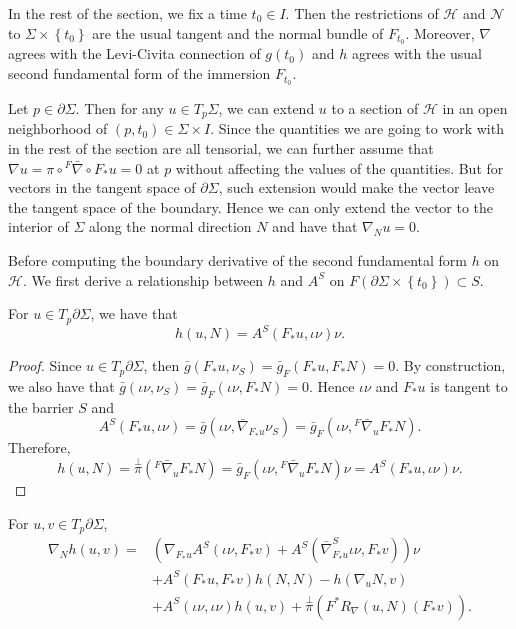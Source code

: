 In the rest of the section, we fix a time $t_0 \in I$. Then the restrictions of $\mathcal{H} $ and $\mathcal{N} $  to $\Sigma \times \left\{ t_0 \right\} $ are the usual tangent and the normal bundle of $F_{t_0}$. Moreover, $\nabla $ agrees with the Levi-Civita connection of $g(t_0)$ and $h$ agrees with the usual second fundamental form of the immersion $F_{t_0}$. 

Let $p \in \partial \Sigma $. Then for any $u \in T_p \Sigma $, we can extend $u$ to a section of $\mathcal{H} $ in an open neighborhood of $(p,t_0) \in \Sigma \times I$. Since the quantities we are going to work with in the rest of the section are all tensorial, we can further assume that $\nabla u = \pi \circ {}^F \bar{\nabla } \circ F_* u = 0$ at $p$ without affecting the values of the quantities. But for vectors in the tangent space of $\partial \Sigma$, such extension would make the vector leave the tangent space of the boundary. Hence we can only extend the vector to the interior of $\Sigma $ along the normal direction $N$ and have that $\nabla _N u=0$.  

Before computing the boundary derivative of the second fundamental form $h$ on $\mathcal{H} $. We first derive a relationship between $h$ and $A^S$ on $F(\partial \Sigma \times \left\{ t_0 \right\} ) \subset S $.

\begin{lemma} \label{htoas}
    For $u \in T_p \partial \Sigma $, we have that 
    \[h(u,N)=A^S(F_{*}u, \iota \nu ) \nu. \] 
\end{lemma}

\begin{proof}
    Since $u \in T_p \partial \Sigma$, then $\bar{g}(F_* u, \nu _S)=\bar{g}_F(F_* u, F_* N)=0$. By construction, we also have that $\bar{g}(\iota \nu , \nu _S)=\bar{g}_F(\iota \nu , F_* N)=0$. Hence $\iota \nu $ and $F_*u$ is tangent to the barrier $S$ and 
    \[A^S(F_{*}u, \iota \nu )=\bar{g}(\iota \nu , \bar{\nabla }_{F_*u}\nu _S)=\bar{g}_F(\iota \nu ,{}^F \bar{\nabla } _u F_* N).\]
    Therefore,
    \[h(u,N)=\overset{\perp }{\pi} ({}^F \bar{\nabla } _u F_* N)= \bar{g}_F(\iota \nu ,{}^F \bar{\nabla } _u F_* N) \nu = A^S(F_{*}u, \iota \nu ) \nu .\] 
\end{proof}

\begin{theorem}
    For $u,v \in T_p \partial \Sigma $, 
    \begin{equation*}
        \begin{split}
            \nabla _N h(u,v)
            =& \left( \nabla _{F_*u}A^S(\iota \nu , F_*v)+A^S(\bar{\nabla }^{S}_{F_*u} \iota \nu , F_*v)  \right)   \nu \\
            & +A^S(F_*u, F_* v)h(N,N)-h(\nabla_u N, v) \\
            & + A^S(\iota  \nu  , \iota \nu )h(u,v) +\overset{\perp }{\pi} (F^*R_{\nabla }(u,N)(F_* v)).
    \end{split}
    \end{equation*}    
\end{theorem}

